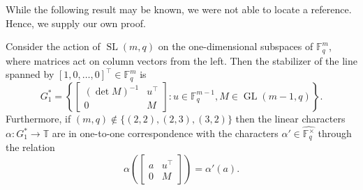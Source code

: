 While the following result may be known, we were not able to locate a reference.
Hence, we supply our own proof.


\begin{proposition}
\label{prop.SL stabilizer}
Consider the action of $\operatorname{SL}(m,q)$ on the one-dimensional subspaces of $\mathbb{F}_q^m$, where matrices act on column vectors from the left.
Then the stabilizer of the line spanned by $[1,0,\ldots,0]^\top\in\mathbb{F}_q^m$ is
\[
G^*_1
=\left\{
\begin{bmatrix}
(\det M)^{-1}&u^\top\\0&M
\end{bmatrix}
: u\in\mathbb{F}_q^{m-1},M\in\operatorname{GL}(m-1,q)
\right\}.
\]
Furthermore, if $(m,q) \notin \{(2,2),(2,3), (3,2)\}$ then the linear characters $\alpha \colon G_1^* \to \mathbb{T}$ are in one-to-one correspondence with the characters $\alpha' \in\widehat{\mathbb{F}_q^\times}$ through the relation
\[
\alpha\left(\begin{bmatrix}
a&u^\top\\0&M
\end{bmatrix}\right)
=\alpha'(a).
\]
\end{proposition}

